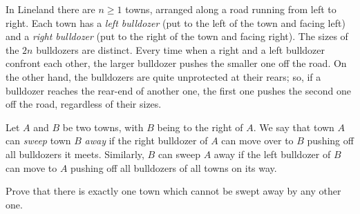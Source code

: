 In Lineland there are $n \geq 1$ towns, arranged along a road running from left to right. Each town has a \emph{left bulldozer} (put to the left of the town and facing left) and a \emph{right bulldozer} (put to the right of the town and facing right). The sizes of the $2n$ bulldozers are distinct. Every time when a right and a left bulldozer confront each other, the larger bulldozer pushes the smaller one off the road. On the other hand, the bulldozers are quite unprotected at their rears; so, if a bulldozer reaches the rear-end of another one, the first one pushes the second one off the road, regardless of their sizes.

Let $A$ and $B$ be two towns, with $B$ being to the right of $A$. We say that town $A$ can \emph{sweep} town $B$ \emph{away} if the right bulldozer of $A$ can move over to $B$ pushing off all bulldozers it meets. Similarly, $B$ can sweep $A$ away if the left bulldozer of $B$ can move to $A$ pushing off all bulldozers of all towns on its way.

Prove that there is exactly one town which cannot be swept away by any other one.

